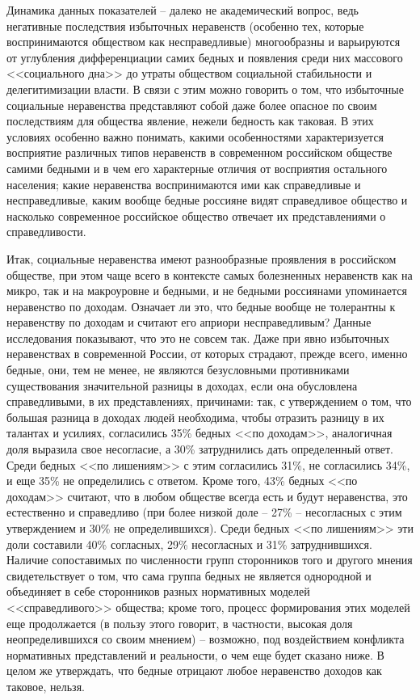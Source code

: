 Динамика данных показателей -- далеко не академический вопрос, ведь негативные 
последствия избыточных неравенств (особенно тех, которые воспринимаются 
обществом как несправедливые) многообразны и варьируются от углубления 
дифференциации самих бедных и появления среди них массового <<социального 
дна>> до утраты обществом социальной стабильности и делегитимизации власти. В 
связи с этим можно говорить о том, что избыточные социальные неравенства 
представляют собой даже более опасное по своим последствиям для общества 
явление, нежели бедность как таковая. В этих условиях особенно важно понимать, 
какими особенностями характеризуется восприятие различных типов неравенств в 
современном российском обществе самими бедными и в чем его характерные отличия 
от восприятия остального населения; какие неравенства воспринимаются ими как 
справедливые и несправедливые, каким вообще бедные россияне видят справедливое 
общество и насколько современное российское общество отвечает их 
представлениями о справедливости.

Итак, социальные неравенства имеют разнообразные проявления в российском 
обществе, при этом чаще всего в контексте самых болезненных неравенств как на 
микро, так и на макроуровне и бедными, и не бедными россиянами упоминается 
неравенство по доходам. Означает ли это, что бедные вообще не толерантны к 
неравенству по доходам и считают его априори несправедливым? Данные 
исследования показывают, что это не совсем так. Даже при явно избыточных 
неравенствах в современной России, от которых страдают, прежде всего, именно 
бедные, они, тем не менее, не являются безусловными противниками существования 
значительной разницы в доходах, если она обусловлена справедливыми, в их 
представлениях, причинами: так, с утверждением о том, что большая разница в 
доходах людей необходима, чтобы отразить разницу в их талантах и усилиях, 
согласились 35\% бедных <<по доходам>>, аналогичная доля выразила свое 
несогласие, а 30\% затруднились дать определенный ответ. Среди бедных <<по 
лишениям>> с этим согласились 31\%, не согласились 34\%, и еще 35\% не 
определились с ответом. Кроме того, 43\% бедных <<по доходам>> считают, что в 
любом обществе всегда есть и будут неравенства, это естественно и справедливо 
(при более низкой доле -- 27\% -- несогласных с этим утверждением и 30\% не 
определившихся). Среди бедных <<по лишениям>> эти доли составили 40\% 
согласных, 29\% несогласных и 31\% затруднившихся. Наличие сопоставимых по 
численности групп сторонников того и другого мнения свидетельствует о том, что 
сама группа бедных не является однородной и объединяет в себе сторонников 
разных нормативных моделей <<справедливого>> общества; кроме того, процесс 
формирования этих моделей еще продолжается (в пользу этого говорит, в 
частности, высокая доля неопределившихся со своим мнением) -- возможно, под 
воздействием конфликта нормативных представлений и реальности, о чем еще будет 
сказано ниже. В целом же утверждать, что бедные отрицают любое неравенство 
доходов как таковое, нельзя.

